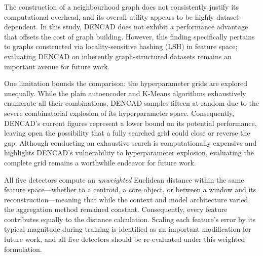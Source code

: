 \documentclass{article}
\begin{document}
The construction of a neighbourhood graph does not consistently justify its computational overhead, 
and its overall utility appears to be highly dataset-dependent. 
In this study, DENCAD does not exhibit a performance advantage that offsets the cost of graph building.
However, this finding specifically pertains to graphs constructed via locality-sensitive hashing (LSH) in feature space; 
evaluating DENCAD on inherently graph-structured datasets remains an important avenue for future work.

One limitation bounds the comparison: the hyperparameter grids are explored unequally. 
While the plain autoencoder and K-Means algorithms exhaustively enumerate all their combinations,
DENCAD samples fifteen at random due to the severe combinatorial explosion of its hyperparameter space.
Consequently, DENCAD's current figures represent a lower bound on its potential performance, 
leaving open the possibility that a fully searched grid could close or reverse the gap.
Although conducting an exhaustive search is computationally expensive and highlights DENCAD's vulnerability to hyperparameter explosion, 
evaluating the complete grid remains a worthwhile endeavor for future work.


All five detectors compute an \emph{unweighted} Euclidean distance within the same feature space—whether to a centroid, 
a core object, or between a window and its reconstruction—meaning that while the context and model architecture varied, 
the aggregation method remained constant. Consequently, every feature contributes equally to the distance calculation.
Scaling each feature's error by its typical magnitude during training is identified as an important modification for future work, 
and all five detectors should be re-evaluated under this weighted formulation.


\end{document}
